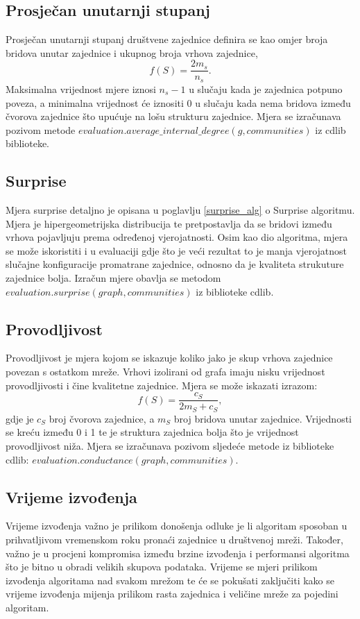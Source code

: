 \documentclass[times, utf8, diplomski]{fer}
\begin{document}
\pagebreak
\subsection{Prosječan unutarnji stupanj}
Prosječan unutarnji stupanj društvene zajednice definira se kao omjer broja bridova unutar zajednice i ukupnog broja vrhova zajednice,
\begin{equation}
	f(S) =  \frac{2m_{s}}{n_{s}}.
\end{equation}
Maksimalna vrijednost mjere iznosi $n_{s} - 1$ u slučaju kada je zajednica potpuno poveza, a minimalna vrijednost će iznositi 0 u slučaju kada nema bridova između čvorova zajednice što upućuje na lošu strukturu zajednice. Mjera se izračunava pozivom metode $evaluation.average\_internal\_degree(g,communities)$ iz cdlib biblioteke.


\subsection{Surprise}
Mjera surprise detaljno je opisana u poglavlju \ref{surprise_alg} o Surprise algoritmu. Mjera je hipergeometrijska distribucija te pretpostavlja da se bridovi između vrhova pojavljuju prema određenoj vjerojatnosti. Osim kao dio algoritma, mjera se može iskoristiti i u evaluaciji gdje što je veći rezultat to je manja vjerojatnost slučajne konfiguracije promatrane zajednice, odnosno da je kvaliteta strukuture zajednice bolja. Izračun mjere obavlja se metodom $evaluation.surprise(graph, communities)$ iz biblioteke cdlib.


\subsection{Provodljivost}
Provodljivost je mjera kojom se iskazuje koliko jako je skup vrhova zajednice povezan s ostatkom mreže. Vrhovi izolirani od grafa imaju nisku vrijednost provodljivosti i čine kvalitetne zajednice. Mjera se može iskazati izrazom:
\begin{equation}
	f(S) = \frac{c_{S}}{2m_{S} + c_{S}},
\end{equation}
gdje je $c_{S}$ broj čvorova zajednice, a $m_{S}$ broj bridova unutar zajednice. Vrijednosti se kreću između 0 i 1 te je struktura zajednica bolja što je vrijednost provodljivost niža. Mjera se izračunava pozivom sljedeće metode iz biblioteke cdlib: $evaluation.conductance(graph, communities)$.


\subsection{Vrijeme izvođenja}
Vrijeme izvođenja važno je prilikom donošenja odluke je li algoritam sposoban u prihvatljivom vremenskom roku pronaći zajednice u društvenoj mreži. Također, važno je u procjeni kompromisa između brzine izvođenja i performansi algoritma što je bitno u obradi velikih skupova podataka. Vrijeme se mjeri prilikom izvođenja algoritama nad svakom mrežom te će se pokušati zaključiti kako se vrijeme izvođenja mijenja prilikom rasta zajednica i veličine mreže za pojedini algoritam.
\end{document}
